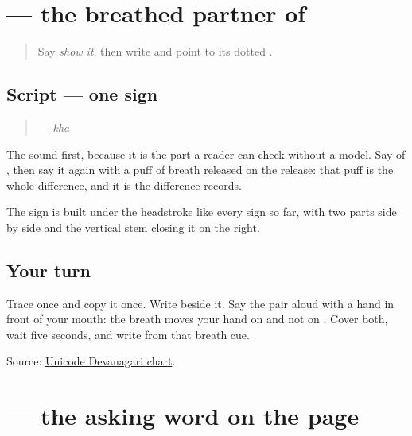 \section[\texorpdfstring{\mw{ख} (kha)}{ख (kha)}]{ — the breathed partner of }

\label{lesson:MW-W21-kha}



\begin{quote}
Say \emph{show it}, then write \textbf{} and point to its dotted \textbf{}.
\end{quote}

\subsection*{Script — one sign}

\begin{quote}
\textbf{} — \emph{kha}
\end{quote}

The sound first, because it is the part a reader can check without a model. Say \textbf{} of \textbf{}, then say it again with a puff of breath released on the release: that puff is the whole difference, and it is the difference \textbf{} records.

The sign is built under the headstroke like every sign so far, with two parts side by side and the vertical stem closing it on the right.

\subsection*{Your turn}
Trace \textbf{} once and copy it once. Write \textbf{} beside it. Say the pair aloud with a hand in front of your mouth: the breath moves your hand on \textbf{} and not on \textbf{}. Cover both, wait five seconds, and write \textbf{} from that breath cue.

\begin{tcolorbox}[breakable,colback=teal!4,colframe=teal!35!black,title={Before you move on}]
Source: \href{https://www.unicode.org/charts/PDF/U0900.pdf}{Unicode Devanagari chart}.
\end{tcolorbox}
\section[\texorpdfstring{\mw{दिखावो} (dikhāvo)}{दिखावो (dikhāvo)}]{ — the asking word on the page}


